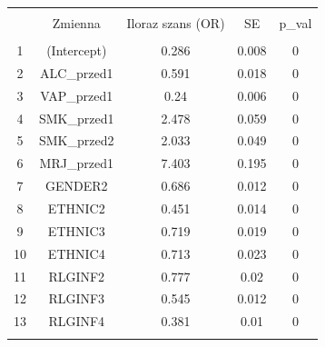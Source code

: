 
\begin{tabular}{@{\extracolsep{5pt}} ccccc} 
\\[-1.8ex]\hline 
\hline \\[-1.8ex] 
 & Zmienna & Iloraz szans (OR) & SE & p\_val \\ 
\hline \\[-1.8ex] 
1 & (Intercept) & 0.286 & 0.008 & 0 \\ 
2 & ALC\_przed1 & 0.591 & 0.018 & 0 \\ 
3 & VAP\_przed1 & 0.24 & 0.006 & 0 \\ 
4 & SMK\_przed1 & 2.478 & 0.059 & 0 \\ 
5 & SMK\_przed2 & 2.033 & 0.049 & 0 \\ 
6 & MRJ\_przed1 & 7.403 & 0.195 & 0 \\ 
7 & GENDER2 & 0.686 & 0.012 & 0 \\ 
8 & ETHNIC2 & 0.451 & 0.014 & 0 \\ 
9 & ETHNIC3 & 0.719 & 0.019 & 0 \\ 
10 & ETHNIC4 & 0.713 & 0.023 & 0 \\ 
11 & RLGINF2 & 0.777 & 0.02 & 0 \\ 
12 & RLGINF3 & 0.545 & 0.012 & 0 \\ 
13 & RLGINF4 & 0.381 & 0.01 & 0 \\ 
\hline \\[-1.8ex] 
\end{tabular} 
